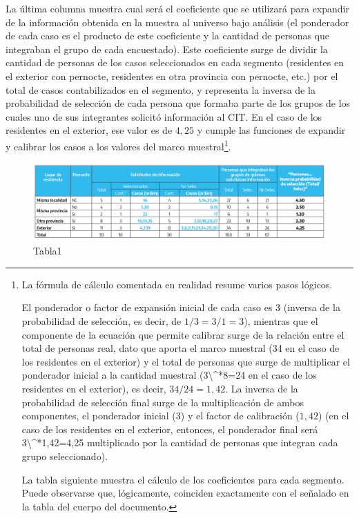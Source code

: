 \documentclass[
]{book}
\begin{document}
La última columna muestra cual será el coeficiente que se utilizará para expandir de la información obtenida en la muestra al universo bajo análisis (el ponderador de cada caso es el producto de este coeficiente y la cantidad de personas que integraban el grupo de cada encuestado). Este coeficiente surge de dividir la cantidad de personas de los casos seleccionados en cada segmento (residentes en el exterior con pernocte, residentes en otra provincia con pernocte, etc.) por el total de casos contabilizados en el segmento, y representa la inversa de la probabilidad de selección de cada persona que formaba parte de los grupos de los cuales uno de sus integrantes solicitó información al CIT. En el caso de los residentes en el exterior, ese valor es de \(4,25\) y cumple las funciones de expandir y calibrar los casos a los valores del marco muestral\footnote{La fórmula de cálculo comentada en realidad resume varios pasos lógicos.

  El ponderador o factor de expansión inicial de cada caso es 3 (inversa de la probabilidad de selección, es decir, de \(1/3=3/1=3\)), mientras que el componente de la ecuación que permite calibrar surge de la relación entre el total de personas real, dato que aporta el marco muestral (34 en el caso de los residentes en el exterior) y el total de personas que surge de multiplicar el ponderador inicial a la cantidad muestral (3\textbackslash\^{}*8=24 en el caso de los residentes en el exterior), es decir, \(34/24=1,42\). La inversa de la probabilidad de selección final surge de la multiplicación de ambos componentes, el ponderador inicial (\(3\)) y el factor de calibración (\(1,42\)) (en el caso de los residentes en el exterior, entonces, el ponderador final será 3\textbackslash\^{}*1,42=4,25 multiplicado por la cantidad de personas que integran cada grupo seleccionado).

  La tabla siguiente muestra el cálculo de los coeficientes para cada segmento. Puede observarse que, lógicamente, coinciden exactamente con el señalado en la tabla del cuerpo del documento.}.

\begin{figure}

{\centering \includegraphics[width=1\linewidth]{imagenes/tabla_1} 

}

\caption{Tabla1}\label{fig:Coeficientes}
\end{figure}
\end{document}
